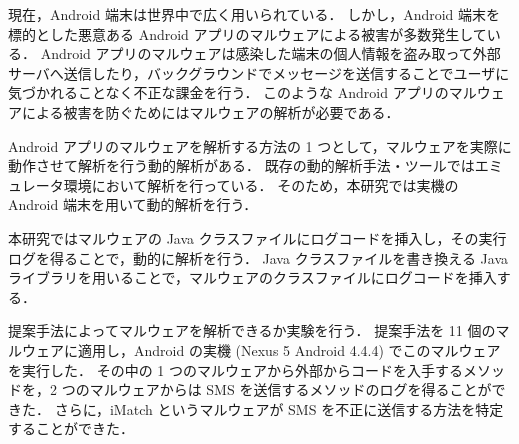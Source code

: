 \setlength{\parindent}{10pt}

現在，Android 端末は世界中で広く用いられている．
しかし，Android 端末を標的とした悪意ある Android アプリのマルウェアによる被害が多数発生している．
Android アプリのマルウェアは感染した端末の個人情報を盗み取って外部サーバへ送信したり，バックグラウンドでメッセージを送信することでユーザに気づかれることなく不正な課金を行う．
このような Android アプリのマルウェアによる被害を防ぐためにはマルウェアの解析が必要である．


Android アプリのマルウェアを解析する方法の 1 つとして，マルウェアを実際に動作させて解析を行う動的解析がある．
既存の動的解析手法・ツールではエミュレータ環境において解析を行っている．
そのため，本研究では実機の Android 端末を用いて動的解析を行う．

本研究ではマルウェアの Java クラスファイルにログコードを挿入し，その実行ログを得ることで，動的に解析を行う．
Java クラスファイルを書き換える Java ライブラリを用いることで，マルウェアのクラスファイルにログコードを挿入する．

提案手法によってマルウェアを解析できるか実験を行う．
提案手法を 11 個のマルウェアに適用し，Android の実機 (Nexus 5 Android 4.4.4) でこのマルウェアを実行した．
その中の 1 つのマルウェアから外部からコードを入手するメソッドを，2 つのマルウェアからは SMS を送信するメソッドのログを得ることができた．
さらに，iMatch というマルウェアが SMS を不正に送信する方法を特定することができた．